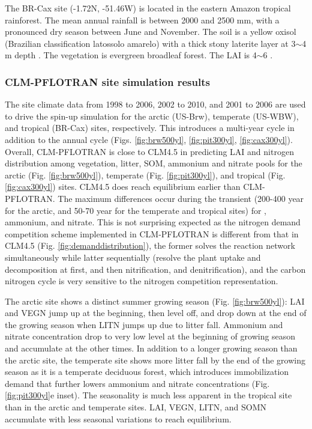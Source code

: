 \documentclass[gmd, manuscript]{copernicus}
\begin{document}
The BR-Cax site (-1.72N, -51.46W) is located in the eastern Amazon tropical
rainforest. The mean annual rainfall is between 2000 and 2500 \unit{mm}, with a
pronounced dry season between June and November. The soil is a yellow oxisol
(Brazilian classification latossolo amarelo) with a thick stony laterite layer
at 3$\sim$4 m depth \citep{daCosta2010}. The vegetation is evergreen
broadleaf forest. The LAI is 4$\sim$6 \citep{Powell2013}. 

\subsubsection{CLM-PFLOTRAN site simulation results}
The site climate data from 1998 to 2006, 2002 to 2010, and 2001 to 2006  are
used to drive the spin-up simulation for the arctic (US-Brw), temperate
(US-WBW), and tropical (BR-Cax) sites, respectively. This introduces a
multi-year cycle in addition to the annual cycle (Figs. \ref{fig:brw500yl},
\ref{fig:pit300yl}, \ref{fig:cax300yl}). Overall, CLM-PFLOTRAN is close to
CLM4.5 in predicting LAI and nitrogen distribution among vegetation, litter,
SOM, ammonium and nitrate pools for the arctic (Fig. \ref{fig:brw500yl}),
temperate (Fig. \ref{fig:pit300yl}), and tropical (Fig. \ref{fig:cax300yl})
sites. CLM4.5 does reach equilibrium earlier than CLM-PFLOTRAN. The maximum
differences occur during the transient (200-400 year for the arctic, and 50-70
year for the temperate and tropical sites) for , ammonium, and
nitrate. This is not surprising expected as the nitrogen demand competition
scheme implemented in CLM-PFLOTRAN is different from that in CLM4.5 (Fig.
\ref{fig:demanddistribution}), the former solves the reaction network
simultaneously while latter sequentially (resolve the plant uptake and
decomposition at first, and then nitrification, and denitrification), and the
carbon nitrogen cycle is very sensitive to the nitrogen competition
representation. 

The arctic site shows a distinct summer growing season (Fig.
\ref{fig:brw500yl}): LAI and VEGN jump up at the beginning, then level off, and
drop down at the end of the growing season when LITN jumps up due to litter fall.
Ammonium and nitrate concentration drop to very low level at the beginning of
growing season and accumulate at the other times. In addition to a longer growing
season than the arctic site, the temperate site shows more litter fall by the
end of the growing season as it is a temperate deciduous forest, which introduces
immobilization demand that further lowers ammonium and nitrate
concentrations (Fig. \ref{fig:pit300yl}e inset). The seasonality is much less
apparent in the tropical site than in the arctic and temperate sites. LAI,
VEGN, LITN, and SOMN accumulate with less seasonal variations to reach 
equilibrium. 
\end{document}
